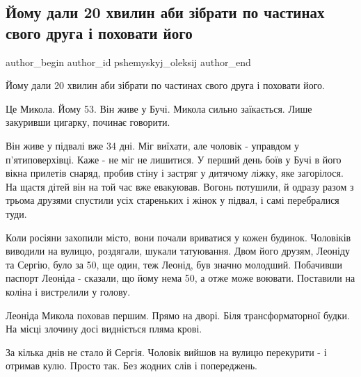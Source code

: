  
 
 
 
 
 
\subsection{Йому дали 20 хвилин аби зібрати по частинах свого друга і поховати його}
\label{sec:05_04_2022.fb.pshemyskyj_oleksij.1.bucha_mykola}
 
\ifcmt
 author_begin
   author_id pshemyskyj_oleksij
 author_end
\fi

Йому дали 20 хвилин аби зібрати по частинах свого друга і поховати його. 

Це Микола. Йому 53. Він живе у Бучі. Микола сильно заїкається. Лише закуривши
цигарку, починає говорити.

Він живе у підвалі вже 34 дні. Міг виїхати, але чоловік - управдом у
п'ятиповерхівці. Каже - не міг не лишитися. У перший день боїв у Бучі в його
вікна прилетів снаряд, пробив стіну і застряг у дитячому ліжку, яке загорілося.
На щастя дітей він на той час вже евакуював. Вогонь потушили, й одразу разом з
трьома друзями спустили усіх стареньких і жінок у підвал, і самі перебралися
туди. 


Коли росіяни захопили місто, вони почали вриватися у кожен будинок. Чоловіків
виводили на вулицю, роздягали, шукали татуювання. Двом його друзям, Леоніду та
Сергію, було за 50, ще один, теж Леонід, був значно молодший. Побачивши паспорт
Леоніда - сказали, що йому нема 50, а отже може воювати. Поставили на коліна і
вистрелили у голову. 

Леоніда Микола поховав першим. Прямо на дворі. Біля трансформаторної будки. На
місці злочину досі видніється пляма крові. 

За кілька днів не стало й Сергія. Чоловік вийшов на вулицю перекурити - і
отримав кулю. Просто так. Без жодних слів і попереджень.

